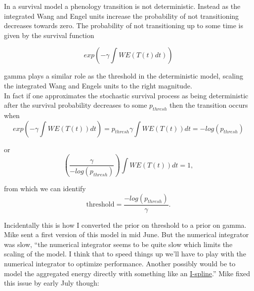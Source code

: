 \documentclass[11pt,letter]{article}
\begin{document}
In a survival model a phenology transition is not deterministic.  Instead as the 
integrated Wang and Engel units increase the probability of not transitioning 
decreases towards zero.  The probability of not transitioning up to some time
is given by the survival function

\begin{equation*}
exp( - \gamma \int WE(T(t) dt))
\end{equation*}

gamma plays a similar role as the threshold in the deterministic model,
scaling the integrated Wang and Engels units to the right magnitude.\\

In fact if one approximates the stochastic survival process as being deterministic 
after the survival probability decreases to some $p_{thresh}$ then the transition
occurs when
\begin{equation*}
exp( - \gamma \int WE(T(t)) dt) = p_{thresh}
\gamma \int WE(T(t)) dt = - log(p_{thresh})
\end{equation*}

or
\begin{equation*}
( \frac{\gamma}{-log(p_{thresh})} ) \int WE(T(t)) dt = 1,
\end{equation*}

from which we can identify 
\begin{equation*}
\mbox{threshold} = \frac{-log(p_{thresh})}{\gamma}.
\end{equation*}

Incidentally this is how I converted the prior on threshold to a prior on gamma.\\


Mike sent a first version of this model in mid June. But the numerical integrator was slow, ``the numerical integrator seems to be quite slow which limits the scaling of the model. I think that to speed things up we’ll have to play with the numerical integrator to  optimize performance.  Another possibly would be to model the aggregated energy directly with something like an \href{https://en.wikipedia.org/wiki/I-spline}{I-spline}.'' Mike fixed this issue by early July though:
\end{document}

